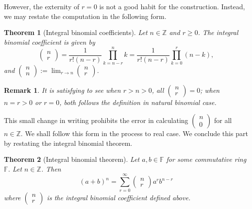 \documentclass[12pt]{article}
\newtheorem*{theorem}{Theorem}
\newtheorem*{remark}{Remark}
\begin{document}
    However, the externity of $r=0$ is not a good habit for the construction. Instead, we may restate the computation in the following form.

    \begin{theorem}[Integral binomial coefficients]
        Let $n\in\mathbb{Z}$ and $r\geq 0$. The integral binomial coefficient is given by \[\begin{pmatrix}
            n\\r
        \end{pmatrix}=\frac{1}{r!(n-r)}\prod_{k=n-r}^{n}k=\frac{1}{r!(n-r)}\prod_{k=0}^r (n-k),\] and $\displaystyle\begin{pmatrix}
            n\\n
        \end{pmatrix}:=\lim_{r\to n}\begin{pmatrix}
            n\\r
        \end{pmatrix}$.
    \end{theorem}

    \begin{remark}
        It is satisfying to see when $r>n>0$, all $\begin{pmatrix}
            n\\r
        \end{pmatrix}=0$; when $n=r>0$ or $r=0$, both follows the definition in natural binomial case.
    \end{remark}

    This small change in writing prohibits the error in calculating $\begin{pmatrix}
        n\\0
    \end{pmatrix}$ for all $n\in\mathbb{Z}$. We shall follow this form in the process to real case. We conclude this part by restating the integral binomial theorem.

    \begin{theorem}[Integral binomial theorem]
        Let $a,b\in\mathbb{F}$ for some commutative ring $\mathbb{F}$. Let $n\in\mathbb{Z}$. Then \[(a+b)^n=\sum_{r=0}^{\infty}\begin{pmatrix}
            n\\r
        \end{pmatrix}a^r b^{n-r}\] where $\begin{pmatrix}
            n\\r
        \end{pmatrix}$ is the integral binomial coefficient defined above.
    \end{theorem}
\end{document}
